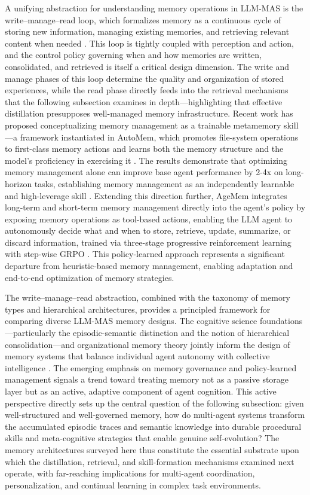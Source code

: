 \documentclass[11pt]{article}
\begin{document}
A unifying abstraction for understanding memory operations in LLM-MAS is the write--manage--read loop, which formalizes memory as a continuous cycle of storing new information, managing existing memories, and retrieving relevant content when needed \cite{ref112}. This loop is tightly coupled with perception and action, and the control policy governing when and how memories are written, consolidated, and retrieved is itself a critical design dimension. The write and manage phases of this loop determine the quality and organization of stored experiences, while the read phase directly feeds into the retrieval mechanisms that the following subsection examines in depth---highlighting that effective distillation presupposes well-managed memory infrastructure. Recent work has proposed conceptualizing memory management as a trainable metamemory skill---a framework instantiated in AutoMem, which promotes file-system operations to first-class memory actions and learns both the memory structure and the model's proficiency in exercising it \cite{ref128}. The results demonstrate that optimizing memory management alone can improve base agent performance by 2-4x on long-horizon tasks, establishing memory management as an independently learnable and high-leverage skill \cite{ref128}. Extending this direction further, AgeMem integrates long-term and short-term memory management directly into the agent's policy by exposing memory operations as tool-based actions, enabling the LLM agent to autonomously decide what and when to store, retrieve, update, summarize, or discard information, trained via three-stage progressive reinforcement learning with step-wise GRPO \cite{ref129}. This policy-learned approach represents a significant departure from heuristic-based memory management, enabling adaptation and end-to-end optimization of memory strategies.

The write--manage--read abstraction, combined with the taxonomy of memory types and hierarchical architectures, provides a principled framework for comparing diverse LLM-MAS memory designs. The cognitive science foundations---particularly the episodic-semantic distinction and the notion of hierarchical consolidation---and organizational memory theory jointly inform the design of memory systems that balance individual agent autonomy with collective intelligence \cite{ref115,ref118}. The emerging emphasis on memory governance and policy-learned management signals a trend toward treating memory not as a passive storage layer but as an active, adaptive component of agent cognition. This active perspective directly sets up the central question of the following subsection: given well-structured and well-governed memory, how do multi-agent systems transform the accumulated episodic traces and semantic knowledge into durable procedural skills and meta-cognitive strategies that enable genuine self-evolution? The memory architectures surveyed here thus constitute the essential substrate upon which the distillation, retrieval, and skill-formation mechanisms examined next operate, with far-reaching implications for multi-agent coordination, personalization, and continual learning in complex task environments.
\end{document}
